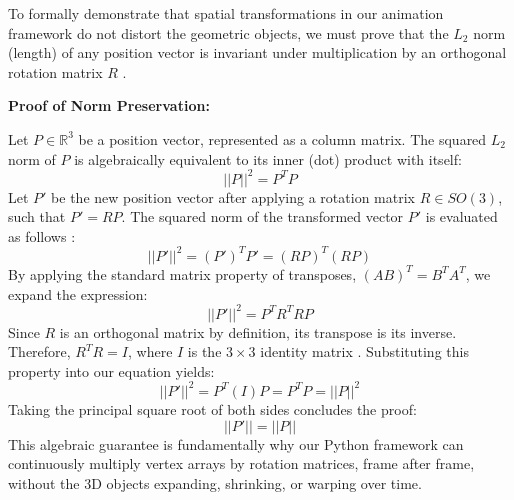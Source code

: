 \documentclass[12pt, a4paper]{report}
\begin{document}
To formally demonstrate that spatial transformations in our animation framework do not distort the geometric objects, we must prove that the $L_2$ norm (length) of any position vector is invariant under multiplication by an orthogonal rotation matrix $R$ \cite{friedberg2019}.

\vspace{0.3cm}
\noindent \textbf{Proof of Norm Preservation:}

\noindent Let $P \in \mathbb{R}^3$ be a position vector, represented as a column matrix. The squared $L_2$ norm of $P$ is algebraically equivalent to its inner (dot) product with itself:
\begin{equation}
    ||P||^2 = P^T P
\end{equation}
Let $P'$ be the new position vector after applying a rotation matrix $R \in SO(3)$, such that $P' = RP$. The squared norm of the transformed vector $P'$ is evaluated as follows \cite{friedberg2019}:
\begin{equation}
    ||P'||^2 = (P')^T P' = (RP)^T (RP)
\end{equation}
By applying the standard matrix property of transposes, $(AB)^T = B^T A^T$, we expand the expression:
\begin{equation}
    ||P'||^2 = P^T R^T R P
\end{equation}
Since $R$ is an orthogonal matrix by definition, its transpose is its inverse. Therefore, $R^T R = I$, where $I$ is the $3 \times 3$ identity matrix \cite{friedberg2019}. Substituting this property into our equation yields:
\begin{equation}
    ||P'||^2 = P^T (I) P = P^T P = ||P||^2
\end{equation}
Taking the principal square root of both sides concludes the proof:
\begin{equation}
    ||P'|| = ||P||
\end{equation}
This algebraic guarantee is fundamentally why our Python framework can continuously multiply vertex arrays by rotation matrices, frame after frame, without the 3D objects expanding, shrinking, or warping over time.
\vspace{0.3cm}
\end{document}
